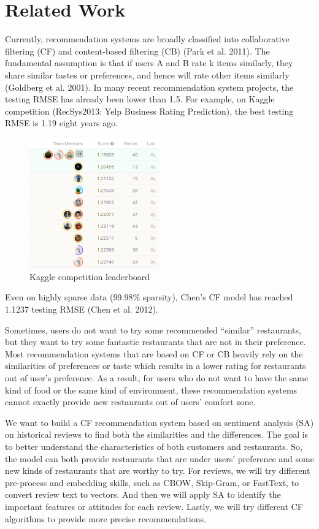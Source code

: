 \documentclass[11pt]{article}
\begin{document}
\section{Related Work}
Currently, recommendation systems are broadly classified into collaborative filtering (CF) and content-based filtering (CB) (Park et al. 2011). The fundamental assumption is that if users A and B rate k items similarly, they share similar tastes or preferences, and hence will rate other items similarly (Goldberg et al. 2001). In many recent recommendation system projects, the testing RMSE has already been lower than 1.5. For example, on Kaggle competition (RecSys2013: Yelp Business Rating Prediction), the best testing RMSE is 1.19 eight years ago.
\begin{figure}[H]
\centering
\includegraphics[width=0.5\textwidth]{kaggle.jpg}
\caption{Kaggle competition leaderboard}
\label{Fig.main2}
\end{figure}
Even on highly sparse data (99.98\% sparsity), Chen’s CF model has reached 1.1237 testing RMSE (Chen et al. 2012).

Sometimes, users do not want to try some recommended “similar” restaurants, but they want to try some fantastic restaurants that are not in their preference. Most recommendation systems that are based on CF or CB heavily rely on the similarities of preferences or taste which results in a lower rating for restaurants out of user’s preference. As a result, for users who do not want to have the same kind of food or the same kind of environment, these recommendation systems cannot exactly provide new restaurants out of users’ comfort zone.

We want to build a CF recommendation system based on sentiment analysis (SA) on historical reviews to find both the similarities and the differences. The goal is to better understand the characteristics of both customers and restaurants. So, the model can both provide restaurants that are under users’ preference and some new kinds of restaurants that are worthy to try. For reviews, we will try different pre-process and embedding skills, such as CBOW, Skip-Gram, or FastText, to convert review text to vectors. And then we will apply SA to identify the important features or attitudes for each review. Lastly, we will try different CF algorithms to provide more precise recommendations.
\end{document}

